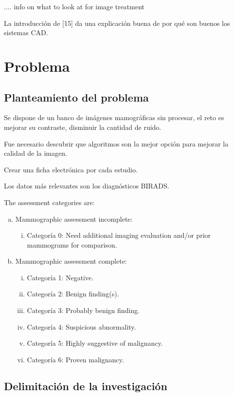 .... info on what to look at for image treatment 

La introducción de [15] da una explicación buena de por qué son buenos los
sistemas CAD.

\section{Problema}
\subsection{Planteamiento del problema}

Se dispone de un banco de imágenes mamográficas sin procesar, el reto es mejorar
su contraste, disminuir la cantidad de ruido.

Fue necesario descubrir que algoritmos son la mejor opción para mejorar la
calidad de la imagen.

Crear una ficha electrónica por cada estudio.

Los datos más relevantes son los diagnósticos BIRADS.

The assessment categories are:
\begin{enumerate}[a)]
    \item Mammographic assessment incomplete:
    \begin{enumerate}[i.]
        \item Categoría 0: Need additional imaging evaluation and/or prior
        mammograms for comparison.
    \end{enumerate}
    \item Mammographic assessment complete:
    \begin{enumerate}[i.]
        \item Categoría 1: Negative.
        \item Categoría 2: Benign finding(s).
        \item Categoría 3: Probably benign finding.
        \item Categoría 4: Suspicious abnormality.
        \item Categoría 5: Highly suggestive of malignancy.         
        \item Categoría 6: Proven malignancy.
    \end{enumerate}
\end{enumerate}

\subsection{Delimitación de la investigación}

